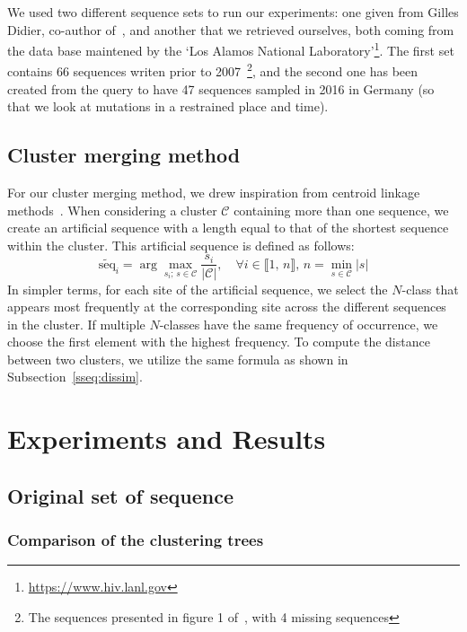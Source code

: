 \documentclass[english,13pt,a4paper]{article}
\theoremstyle{definition}
\theoremstyle{remark}
\theoremstyle{defstyle}
\begin{document}
We used two different sequence sets to run our experiments: one given from Gilles Didier, co-author of~\cite{didier_comparing_2007}, and another that we retrieved ourselves, both coming from the data base maintened by the `Los Alamos National Laboratory'\footnote{\url{https://www.hiv.lanl.gov}}. The first set contains 66 sequences writen prior to 2007~\footnote{The sequences presented in figure 1 of~\cite{didier_comparing_2007}, with 4 missing sequences}, and the second one has been created from the query to have 47 sequences sampled in 2016 in Germany (so that we look at mutations in a restrained place and time).

\subsection{Cluster merging method}\label{ssec:merge}

For our cluster merging method, we drew inspiration from centroid linkage methods~\cite{duda1973pattern}. When considering a cluster $\mathcal{C}$ containing more than one sequence, we create an artificial sequence with a length equal to that of the shortest sequence within the cluster. This artificial sequence is defined as follows:
\[
    \widetilde{\text{seq}}_i = \arg \max_{s_i; \,s \in \mathcal C} \frac{s_i}{|\mathcal C|},  \quad \forall i \in \llbracket 1, \, n \rrbracket, \, n = \min_{s \in \mathcal{C}} |s| 
\]
In simpler terms, for each site of the artificial sequence, we select the $N$-class that appears most frequently at the corresponding site across the different sequences in the cluster. If multiple $N$-classes have the same frequency of occurrence, we choose the first element with the highest frequency. To compute the distance between two clusters, we utilize the same formula as shown in Subsection~\ref{sseq:dissim}. 



\section{Experiments and Results}

\subsection{Original set of sequence}

\subsubsection{Comparison of the clustering trees}
\end{document}
